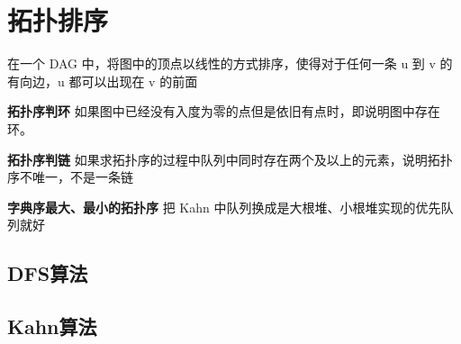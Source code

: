 \section{拓扑排序}
在一个 DAG 中，将图中的顶点以线性的方式排序，使得对于任何一条 u 到 v 的有向边，u 都可以出现在 v 的前面

\textbf{拓扑序判环} 如果图中已经没有入度为零的点但是依旧有点时，即说明图中存在环。

\textbf{拓扑序判链} 如果求拓扑序的过程中队列中同时存在两个及以上的元素，说明拓扑序不唯一，不是一条链

\textbf{字典序最大、最小的拓扑序} 把 Kahn 中队列换成是大根堆、小根堆实现的优先队列就好
\subsection{DFS算法}

\subsection{Kahn算法}
